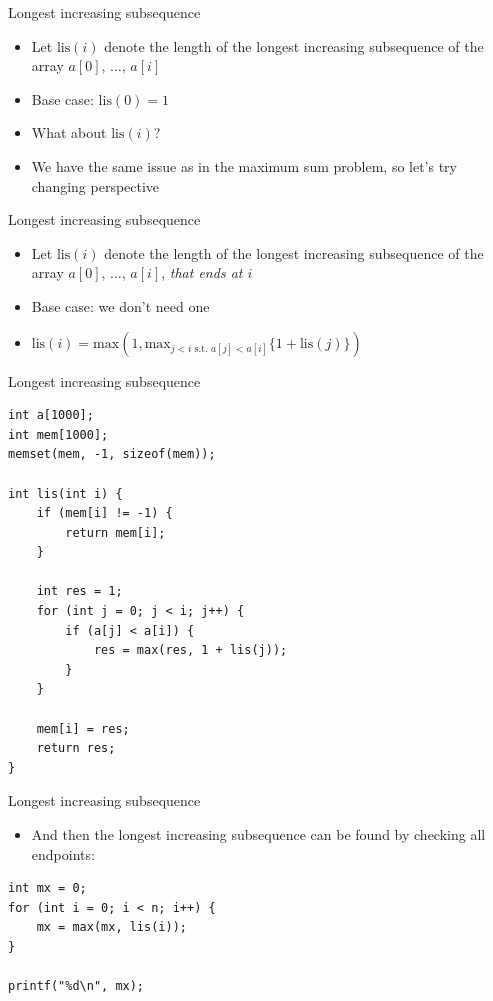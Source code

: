 \documentclass{beamer}
\begin{document}
\begin{frame}[plain]{Longest increasing subsequence}
    \vspace{20pt}
    \begin{itemize}
\item Let $\mathrm{lis}(i)$ denote the length of the longest increasing subsequence of the array $a[0]$, $\ldots$, $a[i]$
    \vspace{5pt}
\item Base case: $\mathrm{lis}(0) = 1$
\item What about $\mathrm{lis}(i)$?
    \vspace{10pt}
\item We have the same issue as in the maximum sum problem, so let's try changing perspective
    \end{itemize}
\end{frame}

\begin{frame}[plain]{Longest increasing subsequence}
    \vspace{40pt}
    \begin{itemize}
\item Let $\mathrm{lis}(i)$ denote the length of the longest increasing subsequence of the array $a[0]$, $\ldots$, $a[i]$, \textit{that ends at $i$}
    \vspace{5pt}
\item Base case: we don't need one
\item $\mathrm{lis}(i) = \mathrm{max}(1, \mathrm{max}_{j<i \textrm{ s.t. } a[j] < a[i]} \{ 1 + \mathrm{lis}(j) \})$
    \end{itemize}
\end{frame}

\begin{frame}{Longest increasing subsequence}
    \begin{verbatim}
int a[1000];
int mem[1000];
memset(mem, -1, sizeof(mem));

int lis(int i) {
    if (mem[i] != -1) {
        return mem[i];
    }

    int res = 1;
    for (int j = 0; j < i; j++) {
        if (a[j] < a[i]) {
            res = max(res, 1 + lis(j));
        }
    }

    mem[i] = res;
    return res;
}
    \end{verbatim}
\end{frame}

\begin{frame}{Longest increasing subsequence}
    \vspace{30pt}

    \begin{itemize}
        \item And then the longest increasing subsequence can be found by checking all endpoints:
    \end{itemize}

    \begin{verbatim}
int mx = 0;
for (int i = 0; i < n; i++) {
    mx = max(mx, lis(i));
}

printf("%d\n", mx);
    \end{verbatim}
\end{frame}
\end{document}
